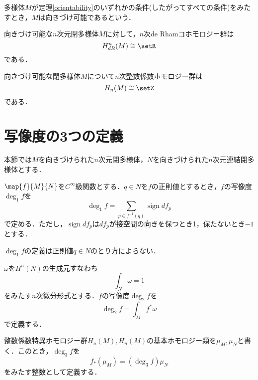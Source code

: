 \documentclass[uplatex]{jsarticle}
\newcommand{\smooth}{C^{\infty}}
\newcommand{\setinverse}[2]{#1 ^{-1}(#2)}
\DeclareMathOperator{\sign}{sign}
\begin{document}
\begin{definition}
多様体$M$が定理\ref{orientability}のいずれかの条件(したがってすべての条件)をみたすとき，$M$は向きづけ可能であるという．
\end{definition}

\begin{theorem}
向きづけ可能な$n$次元閉多様体$M$に対して，$n$次de Rhamコホモロジー群は
\[ H_{dR}^n(M) \cong \setR \]
である．
\end{theorem}

\begin{theorem}
向きづけ可能な閉多様体$M$について$n$次整数係数ホモロジー群は
\[ H_n(M) \cong \setZ \]
である．
\end{theorem}

\section{写像度の3つの定義}
本節では$M$を向きづけられた$n$次元閉多様体，$N$を向きづけられた$n$次元連結閉多様体とする．

\begin{definition}
$\map{f}{M}{N}$を$\smooth$級関数とする．$q\in N$を$f$の正則値とするとき，$f$の写像度$\deg_1 f$を
\[ \deg_1 f = \sum_{p \in \setinverse{f}{q}} \sign df_p \]
で定める．ただし，$\sign df_p$は$df_p$が接空間の向きを保つとき1，保たないとき$-1$とする．
\end{definition}

\begin{lemma}
$\deg_1 f$の定義は正則値$q\in N$のとり方によらない．
\end{lemma}

\begin{definition}
$\omega$を$H^n(N)$の生成元すなわち
\[ \int_N \omega = 1 \]
をみたす$n$次微分形式とする．$f$の写像度$\deg_2 f$を
\[ \deg_2 f = \int_M f^*\omega \]
で定義する．
\end{definition}

\begin{definition}
整数係数特異ホモロジー群$H_n(M),H_n(M)$の基本ホモロジー類を$\mu_M,\mu_N$と書く．このとき，$\deg_3 f$を
\[ f_\ast (\mu_M) = (\deg_3 f) \mu_N \]
をみたす整数として定義する．
\end{definition}
\end{document}
